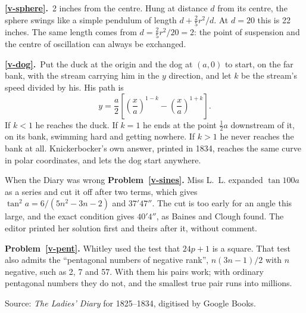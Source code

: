 \documentclass[11pt,a4paper]{article}
\newcommand{\ans}[2]{\par\smallskip\noindent\textbf{\ref{#1}.}\ #2}
\begin{document}
\ans{v-sphere}{2 inches from the centre. Hung at distance $d$ from its centre, the sphere
swings like a simple pendulum of length $d + \tfrac25r^2/d$. At $d = 20$ this is 22 inches.
The same length comes from $d = \tfrac25r^2/20 = 2$: the point of suspension and the centre
of oscillation can always be exchanged.}

\ans{v-dog}{Put the duck at the origin and the dog at $(a, 0)$ to start, on the far bank,
with the stream carrying him in the $y$ direction, and let $k$ be the stream's speed
divided by his. His path is
\[ y = \frac a2\left[\left(\frac xa\right)^{1-k} - \left(\frac xa\right)^{1+k}\right]. \]
If $k < 1$ he reaches the duck. If $k = 1$ he ends at the point $\tfrac12a$ downstream of
it, on its bank, swimming hard and getting nowhere. If $k > 1$ he never reaches the bank
at all. Knickerbocker's own answer, printed in 1834, reaches the same curve in polar
coordinates, and lets the dog start anywhere.}

\begin{diarynote}{When the Diary was wrong}
\textbf{Problem~\ref{v-sines}.} Miss L.~L. expanded $\tan100a$ as a series and cut it off
after two terms, which gives $\tan^2a = 6/(5n^2 - 3n - 2)$ and $37'47''$. The cut is too
early for an angle this large, and the exact condition gives $40'4''$, as Baines and Clough
found. The editor printed her solution first and theirs after it, without
comment.

\textbf{Problem~\ref{v-pent}.} Whitley used the test that $24p + 1$ is a square. That test
also admits the ``pentagonal numbers of negative rank'', $n(3n-1)/2$ with $n$ negative,
such as 2, 7 and 57. With them his pairs work; with ordinary pentagonal numbers they do
not, and the smallest true pair runs into millions.
\end{diarynote}



\vfill
{\small Source: \textit{The Ladies' Diary} for 1825--1834, digitised by Google Books.}
\end{document}
